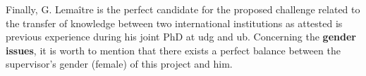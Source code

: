 Finally, G. Lema\^itre is the perfect candidate for the proposed challenge related to the transfer of knowledge between two international institutions as attested is previous experience during his joint PhD at \ac{udg} and \ac{ub}.
Concerning the \textbf{gender issues}, it is worth to mention that there exists a perfect balance between the supervisor's gender (female) of this project and him.






